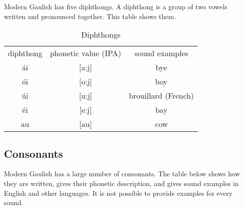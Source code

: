 \noindent Modern Gaulish has five diphthongs. A diphthong is a group of two vowels written and pronounced together. This table shows them.

\begin{table}[H]
\begin{center}
\begin{tabu}{|c|c|c|}
  \toprule
  diphthong & phonetic value (IPA) & sound examples\\
  \'{a}i & [a:j] & bye\\
  \'{o}i & [o:j] & boy\\
  \'{u}i & [u:j] & brouillard (French)\\
  \'{e}i & [e:j] & bay\\
  au & [au] & cow\\
  \bottomrule
\end{tabu}
\end{center}
\caption{Diphthongs}
\label{phonology_diphthongs}
\end{table}

\subsection{Consonants}

\noindent Modern Gaulish has a large number of consonants. The table below shows how they are written, gives their phonetic description, and gives sound examples in English and other languages. It is not possible to provide examples for every sound.

